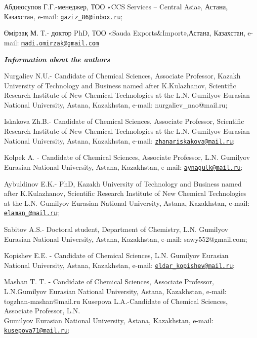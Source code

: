 \begin{authorinfo}
Абдиюсупов Г.Г.-менеджер, ТОО «CCS Services -- Central Asia», Астана,
Казахстан, e-mail:
\href{mailto:gaziz_86@inbox.ru}{\nolinkurl{gaziz\_86@inbox.ru}};

Өмірзақ М. Т.- доктор PhD, ТОО «Sauda Exports\&Import»,Астана,
Казахстан, e-mail:
\href{mailto:madi.omirzak@gmail.com}{\nolinkurl{madi.omirzak@gmail.com}}

\hspace{1em}\emph{{\bfseries Information about the authors}}

Nurgaliev N.U.- Candidate of Chemical Sciences, Associate Professor,
Kazakh University of Technology and Business named after K.Kulazhanov,
Scientific Research Institute of New Chemical Technologies at the L.N.
Gumilyov Eurasian National University, Astana, Kazakhstan, e-mail:
nurgaliev\_nao@mail.ru;

Iskakova Zh.B.- Candidate of Chemical Sciences, Associate Professor,
Scientific Research Institute of New Chemical Technolo\-gies at the L.N.
Gumilyov Eurasian National University, Astana, Kazakhstan, e-mail:
\href{mailto:zhanariskakova@mail.ru}{\nolinkurl{zhanariskakova@mail.ru}};

Kolpek A. - Candidate of Chemical Sciences, Associate Professor, L.N.
Gumilyov Eurasian National University, Astana, Kazakhstan, e-mail:
\href{mailto:aynagulk@mail.ru}{\nolinkurl{aynagulk@mail.ru}};

Aybuldinov E.K.- PhD, Kazakh University of Technology and Business named
after K.Kulazhanov, Scientific Research Institute of New Chemical
Technologies at the L.N. Gumilyov Eurasian National University, Astana,
Kazakhstan, e-mail:\\
\href{mailto:elaman_@mail.ru}{\nolinkurl{elaman\_@mail.ru}};

Sabitov A.S.- Doctoral student, Department of Chemistry, L.N. Gumilyov
Eurasian National University, Astana, Kazakhstan, e-mail:
sawy552@gmail.com;

Kopishev E.E. - Candidate of Chemical Sciences, L.N. Gumilyov Eurasian
National University, Astana, Kazakhstan, e-mail:
\href{mailto:eldar_kopishev@mail.ru}{\nolinkurl{eldar\_kopishev@mail.ru}};

Mashan T. T. - Candidate of Chemical Sciences, Associate Professor,
L.N.Gumilyov Eurasian National University, Astana, Kazakhstan, e-mail:
togzhan-mashan@mail.ru Kusepova L.A.-Candidate of Chemical Sciences,
Associate Professor, L.N. \\Gumilyov Eurasian National University, Astana,
Kazakhstan, e-mail:
\href{mailto:kusepova71@mail.ru}{\nolinkurl{kusepova71@mail.ru}};


\end{authorinfo}
